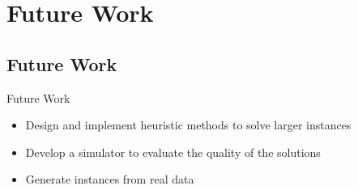 


\section{Future Work}
\subsection{Future Work}
\begin{frame}{Future Work}
  \begin{itemize}
  \item Design and implement heuristic methods to solve larger instances
  \item Develop a simulator to evaluate the quality of the solutions
  \item Generate instances from real data
  \end{itemize}
\end{frame}
